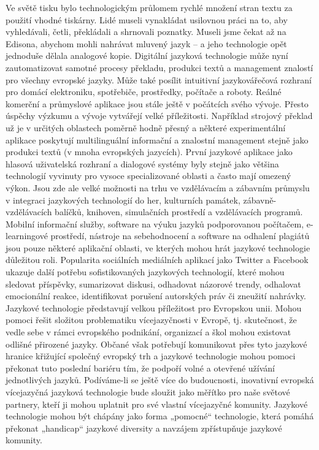 \documentclass[]{../../metanetpaper}
\begin{document}
\begin{multicols}{2}
Ve světě tisku bylo technologickým průlomem rychlé množení stran textu za použití vhodné tiskárny. Lidé museli vynakládat usilovnou práci na to, aby vyhledávali, četli, překládali a shrnovali poznatky. Museli jsme čekat až na Edisona, abychom mohli nahrávat mluvený jazyk – a jeho technologie opět jednoduše dělala analogové kopie.
Digitální jazyková technologie může nyní zautomatizovat samotné procesy překladu, produkci textů a management znalostí pro všechny evropské jazyky. Může také posílit intuitivní jazyková\/řečová rozhraní pro domácí elektroniku, spotřebiče, prostředky, počítače a roboty. Reálné komerční a průmyslové aplikace jsou stále ještě v počátcích svého vývoje. Přesto úspěchy výzkumu a vývoje vytvářejí velké příležitosti. Například strojový překlad už je v určitých oblastech poměrně hodně přesný a některé experimentální aplikace poskytují multilinguální informační a znalostní management stejně jako produkci textů (v mnoha evropských jazycích).
První jazykové aplikace jako hlasová uživatelská rozhraní a dialogové systémy byly stejně jako většina technologií vyvinuty pro vysoce specializované oblasti a často mají omezený výkon. Jsou zde ale velké možnosti na trhu ve vzdělávacím a zábavním průmyslu v integraci jazykových technologií do her, kulturních památek, zábavně-vzdělávacích balíčků, knihoven, simulačních prostředí a vzdělávacích programů. Mobilní informační služby, software na výuku jazyků podporovanou počítačem, e-learningové prostředí, nástroje na sebehodnocení a software na odhalení plagiátů jsou pouze některé aplikační oblasti, ve kterých mohou hrát jazykové technologie důležitou roli. Popularita sociálních mediálních aplikací jako Twitter a Facebook ukazuje další potřebu sofistikovaných jazykových technologií, které mohou sledovat příspěvky, sumarizovat diskusi, odhadovat názorové trendy, odhalovat emocionální reakce, identifikovat porušení autorských práv či zneužití nahrávky.\\
Jazykové technologie představují velkou příležitost pro Evropskou unii. Mohou pomoci řešit složitou problematiku vícejazyčnosti v Evropě, tj. skutečnost, že vedle sebe v rámci evropského podnikání, organizací a škol mohou existovat odlišné přirozené jazyky. Občané však potřebují komunikovat přes tyto jazykové hranice křižující společný evropský trh a jazykové technologie mohou pomoci překonat tuto poslední bariéru tím, že podpoří volné a otevřené užívání jednotlivých jazyků. Podíváme-li se ještě více do budoucnosti, inovativní evropská vícejazyčná jazyková technologie bude sloužit jako měřítko pro naše světové partnery, kteří ji mohou uplatnit pro své vlastní vícejazyčné komunity. Jazykové technologie mohou být chápány jako forma „pomocné“ technologie, která pomáhá překonat „handicap“ jazykové diversity a navzájem zpřístupňuje jazykové komunity.


\end{multicols}
\end{document}
